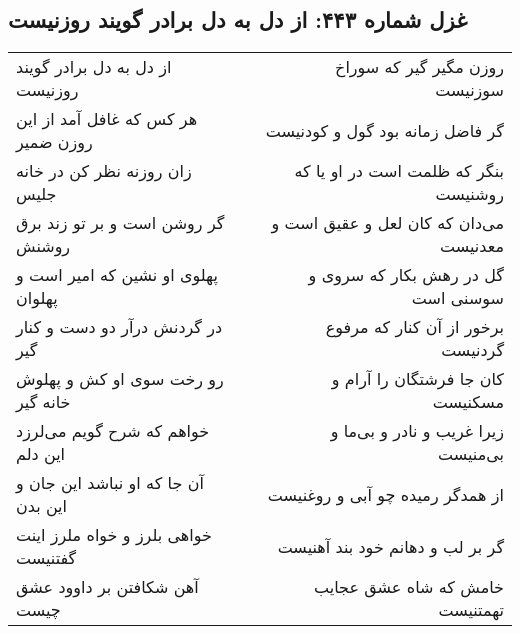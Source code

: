\begin{center}
\section*{غزل شماره ۴۴۳: از دل به دل برادر گویند روزنیست}
\label{sec:0443}
\begin{longtable}{l p{0.5cm} r}
از دل به دل برادر گویند روزنیست
&&
روزن مگیر گیر که سوراخ سوزنیست
\\
هر کس که غافل آمد از این روزن ضمیر
&&
گر فاضل زمانه بود گول و کودنیست
\\
زان روزنه نظر کن در خانه جلیس
&&
بنگر که ظلمت است در او یا که روشنیست
\\
گر روشن است و بر تو زند برق روشنش
&&
می‌دان که کان لعل و عقیق است و معدنیست
\\
پهلوی او نشین که امیر است و پهلوان
&&
گل در رهش بکار که سروی و سوسنی است
\\
در گردنش درآر دو دست و کنار گیر
&&
برخور از آن کنار که مرفوع گردنیست
\\
رو رخت سوی او کش و پهلوش خانه گیر
&&
کان جا فرشتگان را آرام و مسکنیست
\\
خواهم که شرح گویم می‌لرزد این دلم
&&
زیرا غریب و نادر و بی‌ما و بی‌منیست
\\
آن جا که او نباشد این جان و این بدن
&&
از همدگر رمیده چو آبی و روغنیست
\\
خواهی بلرز و خواه ملرز اینت گفتنیست
&&
گر بر لب و دهانم خود بند آهنیست
\\
آهن شکافتن بر داوود عشق چیست
&&
خامش که شاه عشق عجایب تهمتنیست
\\
\end{longtable}
\end{center}
